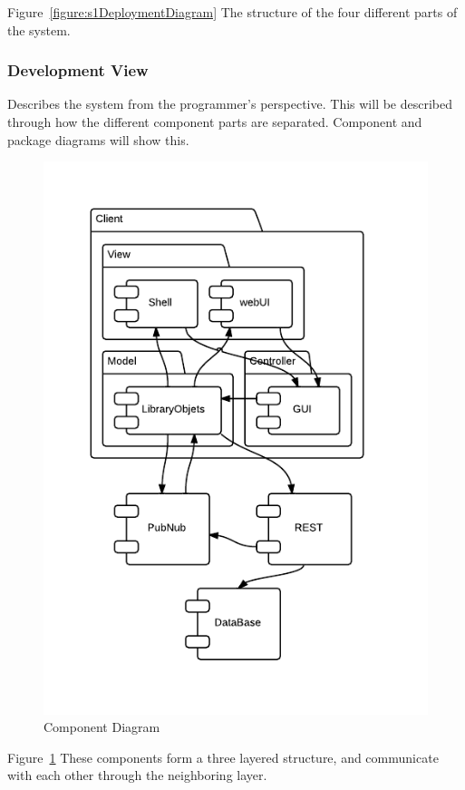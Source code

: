 Figure~\ref{figure:s1DeploymentDiagram} The structure of the four different parts of the system.

\subsubsection{Development View}
Describes the system from the programmer's perspective. This will be described through how the different component parts are separated. Component and package diagrams will show this.

\begin{figure}[h]
\centering
\includegraphics[width=5in]{image/s1ComponentDiagram.png}
\caption{Component Diagram}
\label{figure:s1ComponentDiagram}
\end{figure}

Figure~\ref{figure:s1ComponentDiagram} These components form a three layered structure, and communicate with each other through the neighboring layer.


